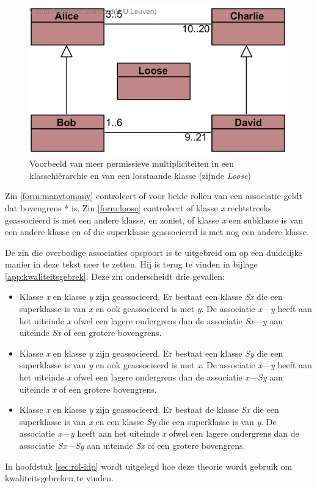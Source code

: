 \begin{figure}
	\centering
	\includegraphics{chap-kwaliteitsgebrek/hierarchy.png}
	\caption{Voorbeeld van meer permissieve multipliciteiten in een klassehi\"erarchie en van een losstaande klasse (zijnde \textit{Loose})}
	\label{fig:hierarchie}
\end{figure}

Zin \ref{form:manytomany} controleert of voor beide rollen van een associatie geldt dat bovengrens * is. Zin \ref{form:loose} controleert of klasse \textit{x} rechtstreeks geassocieerd is met een andere klasse, en zoniet, of klasse \textit{x} een subklasse is van een andere klasse en of die superklasse geassocieerd is met nog een andere klasse.

De zin die overbodige associaties opspoort is te uitgebreid om op een duidelijke manier in deze tekst neer te zetten. Hij is terug te vinden in bijlage \ref{app:kwaliteitsgebrek}.
Deze zin onderscheidt drie gevallen:

\begin{itemize}
	\item Klasse \textit{x} en klasse \textit{y} zijn geassocieerd. Er bestaat een klasse \textit{Sx} die een superklasse is van \textit{x} en ook geassocieerd is met \textit{y}. De associatie \textit{x}---\textit{y} heeft aan het uiteinde \textit{x} ofwel een lagere ondergrens dan de associatie \textit{Sx}---\textit{y} aan uiteinde \textit{Sx} of een grotere bovengrens.
	\item Klasse \textit{x} en klasse \textit{y} zijn geassocieerd. Er bestaat een klasse \textit{Sy} die een superklasse is van \textit{y} en ook geassocieerd is met \textit{x}. De associatie \textit{x}---\textit{y} heeft aan het uiteinde \textit{x} ofwel een lagere ondergrens dan de associatie \textit{x}---\textit{Sy} aan uiteinde \textit{x} of een grotere bovengrens.
	\item Klasse \textit{x} en klasse \textit{y} zijn geassocieerd. Er bestaat de klasse \textit{Sx} die een superklasse is van \textit{x} en een klasse \textit{Sy} die een superklasse is van \textit{y}. De associatie \textit{x}---\textit{y} heeft aan het uiteinde \textit{x} ofwel een lagere ondergrens dan de associatie \textit{Sx}---\textit{Sy} aan uiteinde \textit{Sx} of een grotere bovengrens.
\end{itemize}

In hoofdstuk \ref{sec:rol-idp} wordt uitgelegd hoe deze theorie wordt gebruik om kwaliteitsgebreken te vinden.